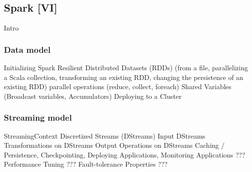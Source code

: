 \subsection{Spark [VI]}

Intro

\cite{Zaharia2010}
\cite{Zaharia2013}
\cite{Spark1}
\cite{Spark2}

\subsubsection{Data model}

Initializing Spark
Resilient Distributed Datasets (RDDs) (from a file, parallelizing a Scala collection, transforming an existing RDD, changing the persistence of an existing RDD)
parallel operations (reduce, collect, foreach)
Shared Variables (Broadcast variables, Accumulators)
Deploying to a Cluster

\subsubsection{Streaming model}

StreamingContext
Discretized Streams (DStreams)
Input DStreams
Transformations on DStreams
Output Operations on DStreams
Caching / Persistence, Checkpointing, Deploying Applications, Monitoring Applications ???
Performance Tuning ???
Fault-tolerance Properties ???